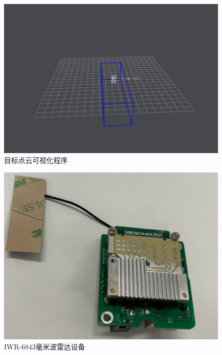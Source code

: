 \begin{figure}[htbp]
    \centering
    \includegraphics[width=0.5\linewidth]{imgs/pointcloud visuallization program.jpg}
    \caption{目标点云可视化程序}
    \label{fig:pointcloud visuallization program}
\end{figure}
\begin{figure}[htbp]
    \centering
    \includegraphics[width=0.5\linewidth]{imgs/mmware radar.jpg}
    \caption{IWR-6843毫米波雷达设备}
    \label{fig:IWR6843}
\end{figure}
